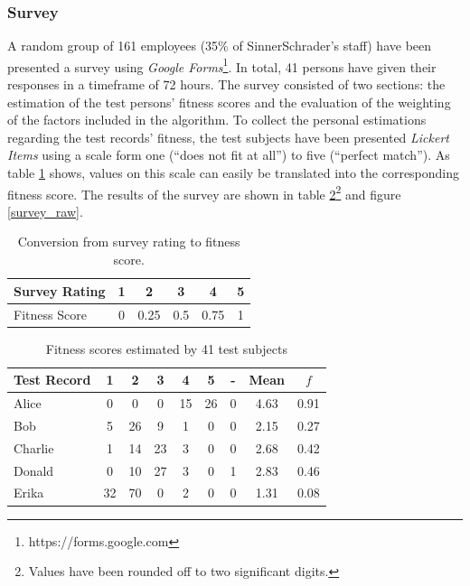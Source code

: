 \subsubsection{Survey}
A random group of 161 employees (35\% of SinnerSchrader's staff) have been presented a survey using \textit{Google Forms}\footnote{https://forms.google.com}.
In total, 41 persons have given their responses in a timeframe of 72 hours.
The survey consisted of two sections: the estimation of the test persons' fitness scores and the evaluation of the weighting of the factors included in the algorithm. To collect the personal estimations regarding the test records' fitness, the test subjects have been presented \textit{Lickert Items} using a scale form one (``does not fit at all'') to five (``perfect match''). As table \ref{tab:scoretrans} shows, values on this scale can easily be translated into the corresponding fitness score. The results of the survey are shown in table \ref{tab:survey_raw}\footnote{Values have been rounded off to two significant digits.} and figure \ref{survey_raw}.
\begin{table}[H]
\centering
\begin{tabular}{l||c|c|c|c|c}
	Survey Rating & 1 & 2    & 3   & 4    & 5\\
	\hline
	Fitness Score & 0 & 0.25 & 0.5 & 0.75 & 1\\
\end{tabular}
\caption[Survey: Rating to Fitness Score]{Conversion from survey rating to fitness score.}
\label{tab:scoretrans}
\end{table}

\begin{table}[H]
\centering
\begin{tabular}{l||c|c|c|c|c|c||c|c}
Test Record & 1  & 2  & 3  & 4  & 5  & - & Mean & $f$ \\
\hline
Alice       & 0  & 0  & 0  & 15 & 26 & 0 & 4.63 & 0.91 \\
Bob         & 5  & 26 & 9  & 1  & 0  & 0 & 2.15 & 0.27 \\
Charlie     & 1  & 14 & 23 & 3  & 0  & 0 & 2.68 & 0.42 \\
Donald      & 0  & 10 & 27 & 3  & 0  & 1 & 2.83 & 0.46 \\
Erika       & 32 & 70 & 0  & 2  & 0  & 0 & 1.31 & 0.08 \\
\end{tabular}
\caption[Survey: Estimated Fitness Scores]{Fitness scores estimated by 41 test subjects}
\label{tab:survey_raw}
\end{table}

